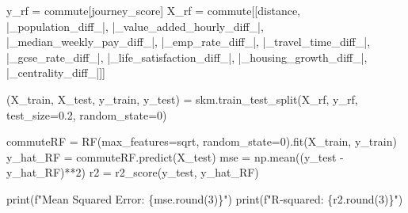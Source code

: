 \documentclass[
  number]{elsarticle}
\newenvironment{Shaded}{\begin{snugshade}}{\end{snugshade}}
\newcommand{\BuiltInTok}[1]{\textcolor[rgb]{0.00,0.23,0.31}{#1}}
\newcommand{\DecValTok}[1]{\textcolor[rgb]{0.68,0.00,0.00}{#1}}
\newcommand{\FloatTok}[1]{\textcolor[rgb]{0.68,0.00,0.00}{#1}}
\newcommand{\NormalTok}[1]{\textcolor[rgb]{0.00,0.23,0.31}{#1}}
\newcommand{\OperatorTok}[1]{\textcolor[rgb]{0.37,0.37,0.37}{#1}}
\newcommand{\SpecialCharTok}[1]{\textcolor[rgb]{0.37,0.37,0.37}{#1}}
\newcommand{\SpecialStringTok}[1]{\textcolor[rgb]{0.13,0.47,0.30}{#1}}
\newcommand{\StringTok}[1]{\textcolor[rgb]{0.13,0.47,0.30}{#1}}
\begin{document}
\begin{Shaded}
\begin{Highlighting}[]
\NormalTok{y\_rf }\OperatorTok{=}\NormalTok{ commute[}\StringTok{\textquotesingle{}journey\_score\textquotesingle{}}\NormalTok{]}
\NormalTok{X\_rf }\OperatorTok{=}\NormalTok{ commute[[}\StringTok{\textquotesingle{}distance\textquotesingle{}}\NormalTok{, }\StringTok{\textquotesingle{}|\_population\_diff\_|\textquotesingle{}}\NormalTok{, }\StringTok{\textquotesingle{}|\_value\_added\_hourly\_diff\_|\textquotesingle{}}\NormalTok{,}
                \StringTok{\textquotesingle{}|\_median\_weekly\_pay\_diff\_|\textquotesingle{}}\NormalTok{, }\StringTok{\textquotesingle{}|\_emp\_rate\_diff\_|\textquotesingle{}}\NormalTok{,}
                 \StringTok{\textquotesingle{}|\_travel\_time\_diff\_|\textquotesingle{}}\NormalTok{, }\StringTok{\textquotesingle{}|\_gcse\_rate\_diff\_|\textquotesingle{}}\NormalTok{,}
                 \StringTok{\textquotesingle{}|\_life\_satisfaction\_diff\_|\textquotesingle{}}\NormalTok{, }\StringTok{\textquotesingle{}|\_housing\_growth\_diff\_|\textquotesingle{}}\NormalTok{,}
                 \StringTok{\textquotesingle{}|\_centrality\_diff\_|\textquotesingle{}}\NormalTok{]]}

\NormalTok{(X\_train,}
\NormalTok{ X\_test,}
\NormalTok{ y\_train,}
\NormalTok{ y\_test) }\OperatorTok{=}\NormalTok{ skm.train\_test\_split(X\_rf,}
\NormalTok{                                y\_rf,}
\NormalTok{                                test\_size}\OperatorTok{=}\FloatTok{0.2}\NormalTok{,}
\NormalTok{                                random\_state}\OperatorTok{=}\DecValTok{0}\NormalTok{)}

\NormalTok{commuteRF }\OperatorTok{=}\NormalTok{ RF(max\_features}\OperatorTok{=}\StringTok{\textquotesingle{}sqrt\textquotesingle{}}\NormalTok{,}
\NormalTok{               random\_state}\OperatorTok{=}\DecValTok{0}\NormalTok{).fit(X\_train, y\_train)}
\NormalTok{y\_hat\_RF }\OperatorTok{=}\NormalTok{ commuteRF.predict(X\_test)}
\NormalTok{mse }\OperatorTok{=}\NormalTok{ np.mean((y\_test }\OperatorTok{{-}}\NormalTok{ y\_hat\_RF)}\OperatorTok{**}\DecValTok{2}\NormalTok{)}
\NormalTok{r2 }\OperatorTok{=}\NormalTok{ r2\_score(y\_test, y\_hat\_RF)}

\BuiltInTok{print}\NormalTok{(}\SpecialStringTok{f"Mean Squared Error: }\SpecialCharTok{\{}\NormalTok{mse}\SpecialCharTok{.}\BuiltInTok{round}\NormalTok{(}\DecValTok{3}\NormalTok{)}\SpecialCharTok{\}}\SpecialStringTok{"}\NormalTok{)}
\BuiltInTok{print}\NormalTok{(}\SpecialStringTok{f"R{-}squared: }\SpecialCharTok{\{}\NormalTok{r2}\SpecialCharTok{.}\BuiltInTok{round}\NormalTok{(}\DecValTok{3}\NormalTok{)}\SpecialCharTok{\}}\SpecialStringTok{"}\NormalTok{)}
\end{Highlighting}
\end{Shaded}
\end{document}
